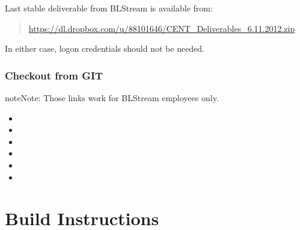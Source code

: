 \documentclass[letterpaper,10pt,english]{sphinxmanual}
\begin{document}
Last stable deliverable from BLStream is available from:
\begin{quote}

\href{https://dl.dropbox.com/u/88101646/CENT\_Deliverables\_6.11.2012.zip}{https://dl.dropbox.com/u/88101646/CENT\_Deliverables\_6.11.2012.zip}
\end{quote}

In either case, logon credentials should not be needed.


\subsubsection{\textbf{Checkout from GIT}}
\label{index:checkout-from-git}
\begin{notice}{note}{Note:}
Those links work for BLStream employees only.
\end{notice}
\begin{itemize}
\item {} 

\item {} 

\item {} 

\item {} 

\item {} 

\item {} 

\end{itemize}


\section{\textbf{Build Instructions}}
\label{index:build-instructions}
\end{document}
